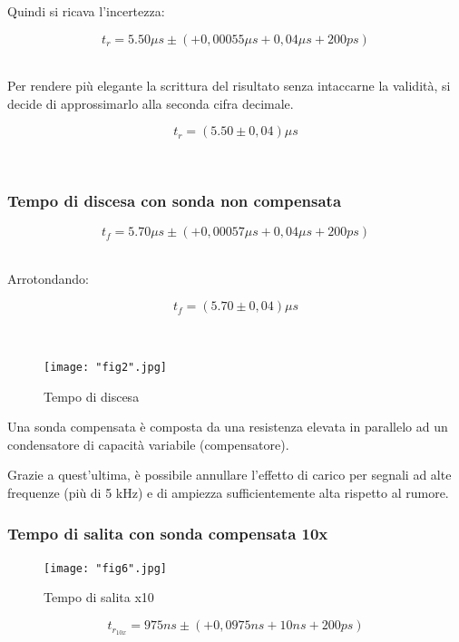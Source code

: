 \documentclass[a4paper]{article}
\begin{document}
Quindi si ricava l'incertezza:
\begin{Large}
	\begin{equation}
  		{t_r}= 5.50\mu s\pm (+ 0,00055\mu s + 0,04\mu s + 200ps)
	\end{equation}
\end{Large}\\
Per rendere più elegante la scrittura del risultato senza intaccarne la validità, si decide di approssimarlo alla seconda cifra decimale.
\begin{Large}
	\begin{equation}
  		{t_r}=( 5.50\pm 0,04 )\mu s
	\end{equation}
\end{Large}\\


\subsubsection{Tempo di discesa con sonda non compensata}

\begin{Large}
	\begin{equation}
  		{t_f}= 5.70\mu s\pm (+ 0,00057\mu s + 0,04\mu s + 200ps)
	\end{equation}
\end{Large}\\

Arrotondando: 

\begin{Large}
	\begin{equation}
  		{t_f}= (5.70\pm 0,04) \mu s
	\end{equation}
\end{Large}\\
\begin{figure}[htp]
	\centering
	\texttt{[image: "fig2".jpg]}
	\caption{Tempo di discesa}
	\label{}
\end{figure}

Una sonda compensata è composta da una resistenza elevata in parallelo ad un condensatore di capacità variabile (compensatore).

Grazie a quest'ultima, è possibile annullare l'effetto di carico per segnali ad alte frequenze (più di 5 kHz) e di ampiezza sufficientemente alta rispetto al rumore.

\subsubsection{Tempo di salita con sonda compensata 10x}
\begin{figure}[htp]
	\centering
	\texttt{[image: "fig6".jpg]}
	\caption{Tempo di salita x10}
	\label{}
\end{figure}
\begin{Large}
	\begin{equation}
		{t_{r_{10x}}}= 975ns \pm( + 0,0975ns + 10ns + 200ps)
	\end{equation}
\end{Large}\\
\end{document}

